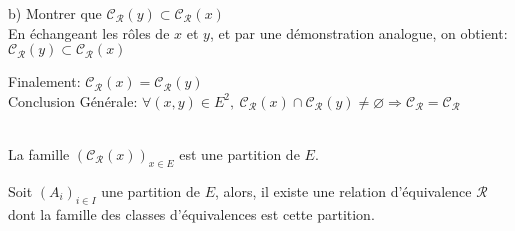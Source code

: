 \documentclass[12pt,twoside,a4paper]{article}
\begin{document}
\begin{preuve}
\begin{liste}
\begin{liste}
						\item[b)] Montrer que $\mathcal{C_R}(y)\subset \mathcal{C_R}(x)$\\
							En \'echangeant les r\^oles de $x$ et $y$, et par une d\'emonstration analogue, on obtient:\\
							$\mathcal{C_R}(y)\subset \mathcal{C_R}(x)$
					\end{liste}
					Finalement: $\mathcal{C_R}(x)=\mathcal{C_R}(y)$\\
					Conclusion G\'en\'erale: $\forall(x,y)\in E^2,\ \mathcal{C_R}(x)\cap\mathcal{C_R}(y)\neq\varnothing\Rightarrow\mathcal{C_R}=\mathcal{C_R}$
			\end{liste}\ \\
			La famille $(\mathcal{C_R}(x))_{x\in E}$ est une partition de $E$.
		\end{preuve}
		\begin{prop}
			Soit $\left(A_i\right)_{i\in I}$ une partition de $E$, alors, il existe une relation d'\'equivalence $\mathcal{R}$ dont la famille des classes d'\'equivalences est cette partition.
		\end{prop}
\end{document}

